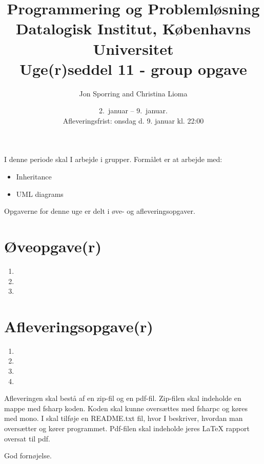 \documentclass[a4paper,12pt]{article}
\title{Programmering og Problemløsning\\Datalogisk Institut,
  Københavns Universitet\\Uge(r)seddel 11 - group opgave}
\author{Jon Sporring and Christina Lioma}
\date{2.\ januar -- 9.\ januar.\\Afleveringsfrist: onsdag d. 9. januar kl. 22:00}
\begin{document}
\maketitle

I denne periode skal I arbejde i grupper. 
Formålet er at arbejde med:
\begin{itemize}
\item Inheritance
\item UML diagrams
\end{itemize}

Opgaverne for denne uge er delt i øve- og afleveringsopgaver. 

\section*{Øveopgave(r)}
\begin{enumerate}[label=11ø.\arabic*,start=0]
\item 
\item 
\item 
\end{enumerate}

\section*{Afleveringsopgave(r)}

\begin{enumerate}[label=11g.\arabic*,start=0]
\item 
\item 
\item 
\item 
\end{enumerate}

Afleveringen skal bestå af en zip-fil og en pdf-fil. Zip-filen skal
indeholde en mappe med fsharp koden. Koden skal kunne oversættes med
fsharpc og køres med mono. I skal tilføje en README.txt fil, hvor I
beskriver, hvordan man oversætter og kører programmet. Pdf-filen skal
indeholde jeres LaTeX rapport oversat til pdf.

\flushright God fornøjelse.
\end{document}
